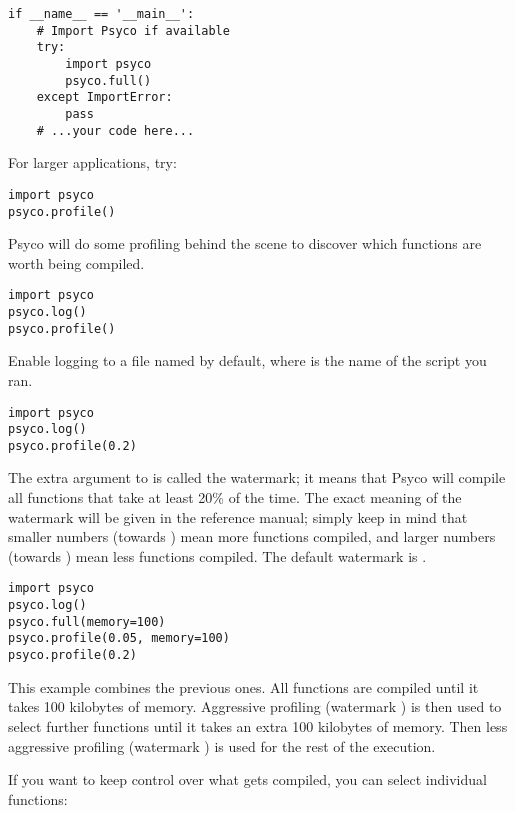 \documentclass{manual}
\begin{document}
\begin{verbatim}
if __name__ == '__main__':
    # Import Psyco if available
    try:
        import psyco
        psyco.full()
    except ImportError:
        pass
    # ...your code here...
\end{verbatim}

For larger applications, try:

\begin{verbatim}
import psyco
psyco.profile()
\end{verbatim}

Psyco will do some profiling behind the scene to discover which functions are worth being compiled.

\begin{verbatim}
import psyco
psyco.log()
psyco.profile()
\end{verbatim}

Enable logging to a file named  by default, where  is the name of the script you ran.

\begin{verbatim}
import psyco
psyco.log()
psyco.profile(0.2)
\end{verbatim}

The extra argument  to  is called the watermark; it means that Psyco will compile all functions that take at least 20\% of the time.  The exact meaning of the watermark will be given in the reference manual; simply keep in mind that smaller numbers (towards ) mean more functions compiled, and larger numbers (towards ) mean less functions compiled.  The default watermark is .

\begin{verbatim}
import psyco
psyco.log()
psyco.full(memory=100)
psyco.profile(0.05, memory=100)
psyco.profile(0.2)
\end{verbatim}

This example combines the previous ones.  All functions are compiled until it takes 100 kilobytes of memory.  Aggressive profiling (watermark ) is then used to select further functions until it takes an extra 100 kilobytes of memory.  Then less aggressive profiling (watermark ) is used for the rest of the execution.  

If you want to keep control over what gets compiled, you can select individual functions:
\end{document}
